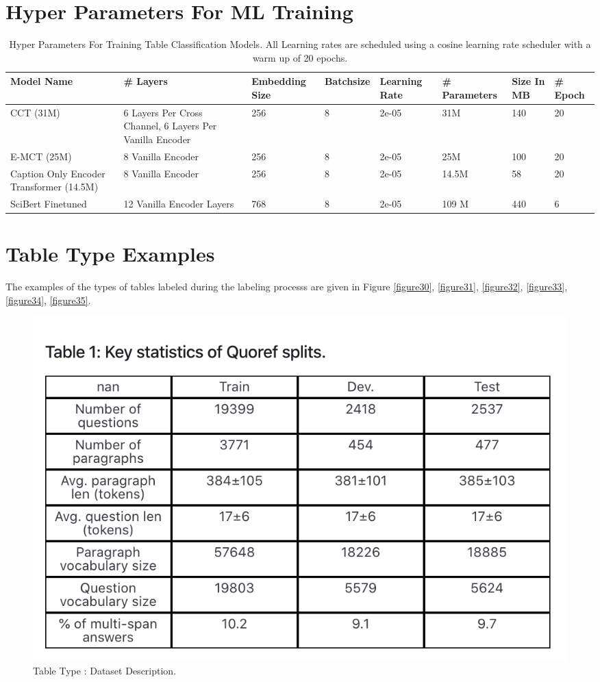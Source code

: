 \section{Hyper Parameters For ML Training}
\begin{table}[h]
  \label{table\arabic{tablecounter}}
  \centering
  \begin{tabular}{|p{1.25cm}|p{1.25cm}|p{1.75cm}|p{1.5cm}|p{1.5cm}|p{1.5cm}|p{1cm}|p{1cm}|}
  \hline
      Model Name & \#  Layers &  Embedding Size & Batchsize & Learning Rate & \#  Parameters & Size In MB & \# Epoch\\ \hline
      CCT (31M) & 6 Layers Per Cross Channel, 6 Layers Per Vanilla Encoder & 256 & 8 & 2e-05 & 31M & 140 & 20\\ \hline
      E-MCT (25M) & 8 Vanilla Encoder & 256 & 8 & 2e-05 & 25M & 100 & 20\\ \hline
      Caption Only Encoder Transformer (14.5M) & 8 Vanilla Encoder & 256 & 8 & 2e-05 & 14.5M & 58 & 20\\ \hline
      SciBert Finetuned & 12 Vanilla Encoder Layers & 768 & 8 & 2e-05 & 109 M & 440 & 6 \\ \hline
  \end{tabular}
  \caption{\label{tablecounter} Hyper Parameters For Training Table Classification Models. All Learning rates are scheduled using a cosine learning rate scheduler with a warm up of 20 epochs. }
\end{table}


\section{Table Type Examples}
\label{appendix:toc:type-exp}
The examples of the types of tables labeled during the labeling processs are given in Figure \ref{figure30}, \ref{figure31}, \ref{figure32}, \ref{figure33}, \ref{figure34}, \ref{figure35}. 
\begin{figure}[h!]
    \centering
    \includegraphics[width=\maxwidth{\textwidth}]{src/images/type-exp-ds-stat.png}
    \caption{Table Type : Dataset Description. }
    \label{figure\arabic{figurecounter}}
\end{figure}

